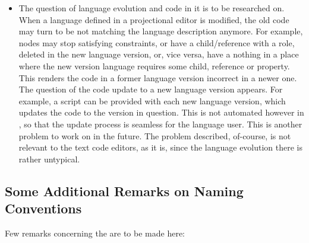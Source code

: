 \begin{itemize}
  \item  The question of language evolution and code in it is to be researched on.  When a language defined in a projectional editor is
  modified, the old code may turn to be not matching the language description anymore. For example, nodes may stop satisfying constraints,
  or have a child/reference with a role, deleted in the new language version, or, vice versa, have a nothing in a place where the new
  version language requires some child, reference or property. This renders the code in a former language version incorrect in a newer one.
  The question of the code update to a new language version appears. For example, a script can be provided with each new language version,
  which updates the code to the version in question. This is not automated however in \jbmps, so that the update process is seamless for the 
  language user. This is another problem to work on in the future. The problem described, of-course, is not relevant to the text code editors,
  as it is, since the language evolution there is rather untypical.
  
  
 \end{itemize}
  
  
  \subsection{Some Additional Remarks on Naming Conventions}
  \label{remarksonnamingconventions}
  Few remarks concerning the   are to be made here:
  
